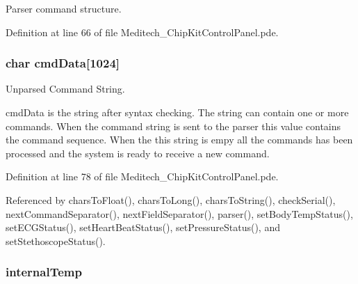 Parser command structure. 



Definition at line 66 of file Meditech\-\_\-\-Chip\-Kit\-Control\-Panel.\-pde.

\hypertarget{_meditech___chip_kit_control_panel_8pde_afd31a444e0380e6be247c64cdb1510a9}{
\subsubsection[{cmd\-Data}]{\setlength{\rightskip}{0pt plus 5cm}char cmd\-Data\mbox{[}1024\mbox{]}\hspace{0.3cm}{\ttfamily [static]}}}\label{_meditech___chip_kit_control_panel_8pde_afd31a444e0380e6be247c64cdb1510a9}


Unparsed Command String. 

cmd\-Data is the string after syntax checking. The string can contain one or more commands. When the command string is sent to the parser this value contains the command sequence. When the this string is empy all the commands has been processed and the system is ready to receive a new command. 

Definition at line 78 of file Meditech\-\_\-\-Chip\-Kit\-Control\-Panel.\-pde.



Referenced by chars\-To\-Float(), chars\-To\-Long(), chars\-To\-String(), check\-Serial(), next\-Command\-Separator(), next\-Field\-Separator(), parser(), set\-Body\-Temp\-Status(), set\-E\-C\-G\-Status(), set\-Heart\-Beat\-Status(), set\-Pressure\-Status(), and set\-Stethoscope\-Status().

\hypertarget{_meditech___chip_kit_control_panel_8pde_adcfca3504612462229db71750def77f9}{
\subsubsection[{internal\-Temp}]{ internal\-Temp}}\label{_meditech___chip_kit_control_panel_8pde_adcfca3504612462229db71750def77f9}


